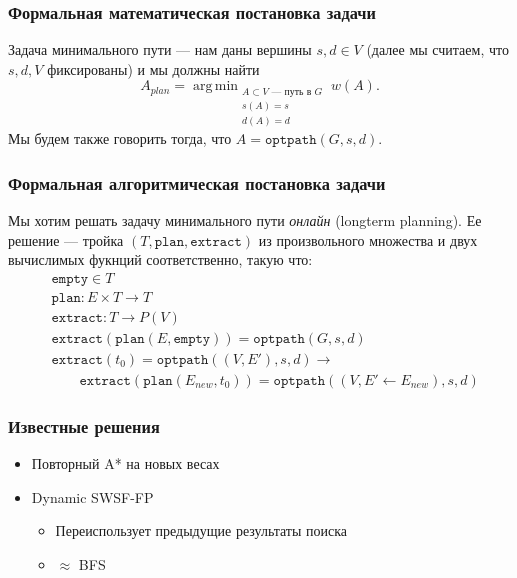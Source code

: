 \documentclass{beamer}
\newcommand{\fplan}{\mathtt{plan}}
\newcommand{\fextract}{\mathtt{extract}}
\newcommand{\fempty}{\mathtt{empty}}
\DeclareMathOperator*{\argmin}{arg\,min}
\begin{document}
    \begin{frame}[fragile]
        \frametitle{Формальная математическая постановка задачи}

        Задача минимального пути --- нам даны вершины $s, d \in V$  (далее мы считаем, что $s, d, V$ фиксированы) и мы должны найти
        $$A_{plan}= \argmin_{\substack{A \subset V \text{ --- путь в } G \\ s(A) = s \\ d(A) = d}} w(A).$$
        Мы будем также говорить тогда, что $A = \mathtt{optpath}(G, s, d)$.

    \end{frame}

    \begin{frame}[fragile]
        \frametitle{Формальная алгоритмическая постановка задачи}

        Мы хотим решать задачу минимального пути \textit{онлайн} (longterm planning).
        Ее решение --- тройка $(T, \fplan, \fextract)$ из произвольного множества и двух вычислимых фукнций соответственно, такую что:
        \begin{align*}
            &\fempty \in T \\
            &\fplan: E \times T \rightarrow T \\
            &\fextract: T \rightarrow P(V) \\
            &\fextract(\fplan(E, \fempty)) = \mathtt{optpath}(G, s, d) \\
            &\fextract(t_0) = \mathtt{optpath}((V, E'), s, d) \rightarrow \\
            &\qquad \fextract(\fplan(E_{new}, t_0)) = \mathtt{optpath}((V, E' \leftarrow E_{new}), s, d)
        \end{align*}

    \end{frame}


    \begin{frame}
        \frametitle{Известные решения}
        \begin{itemize}
            \item Повторный A* на новых весах
            \item Dynamic SWSF-FP
            \begin{itemize}
                \item Переиспользует предыдущие результаты поиска
                \item $\approx$ BFS
            \end{itemize}
        \end{itemize}
    \end{frame}
\end{document}
